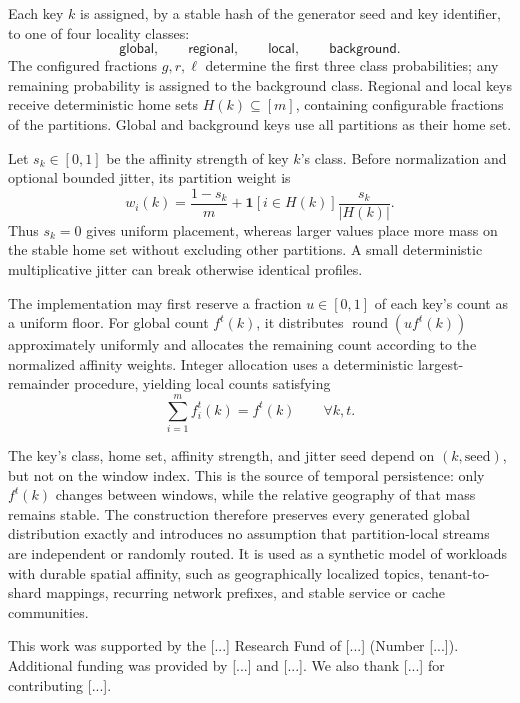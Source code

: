 \documentclass[sigconf, nonacm]{acmart}
\begin{document}
Each key \(k\) is assigned, by a stable hash of the generator seed and key
identifier, to one of four locality classes:
\[
\mathsf{global},\qquad
\mathsf{regional},\qquad
\mathsf{local},\qquad
\mathsf{background}.
\]
The configured fractions \(g,r,\ell\) determine the first three class
probabilities; any remaining probability is assigned to the background
class. Regional and local keys receive deterministic home sets
\(H(k)\subseteq[m]\), containing configurable fractions of the partitions.
Global and background keys use all partitions as their home set.

Let \(s_k\in[0,1]\) be the affinity strength of key \(k\)'s class. Before
normalization and optional bounded jitter, its partition weight is
\[
w_i(k)
=
\frac{1-s_k}{m}
+
\mathbf 1[i\in H(k)]\frac{s_k}{|H(k)|}.
\]
Thus \(s_k=0\) gives uniform placement, whereas larger values place more mass
on the stable home set without excluding other partitions. A small
deterministic multiplicative jitter can break otherwise identical profiles.

The implementation may first reserve a fraction \(u\in[0,1]\) of each key's
count as a uniform floor. For global count \(f^t(k)\), it distributes
\(\operatorname{round}(u f^t(k))\) approximately uniformly and allocates the
remaining count according to the normalized affinity weights. Integer
allocation uses a deterministic largest-remainder procedure, yielding local
counts satisfying
\[
\sum_{i=1}^{m} f_i^t(k)=f^t(k)
\qquad\forall k,t.
\]

The key's class, home set, affinity strength, and jitter seed depend on
\((k,\text{seed})\), but not on the window index. This is the source of
temporal persistence: only \(f^t(k)\) changes between windows, while the
relative geography of that mass remains stable. The construction therefore
preserves every generated global distribution exactly and introduces no
assumption that partition-local streams are independent or randomly routed.
It is used as a synthetic model of workloads with durable spatial affinity,
such as geographically localized topics, tenant-to-shard mappings, recurring
network prefixes, and stable service or cache communities.



\begin{acks}
 This work was supported by the [...] Research Fund of [...] (Number [...]). Additional funding was provided by [...] and [...]. We also thank [...] for contributing [...].
\end{acks}




\end{document}
